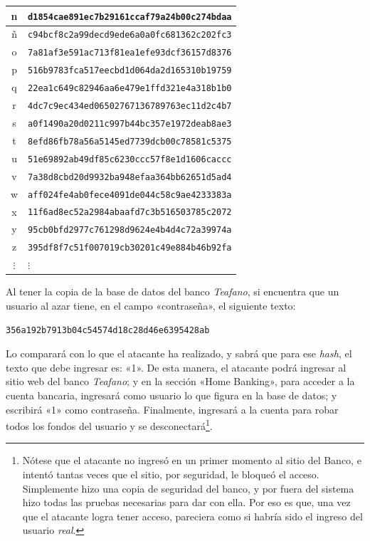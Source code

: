 \documentclass[12pt,a4paper,twoside]{book}
\begin{document}
\begin{center}
\begin{footnotesize}
\begin{longtable}{|c|l|}
n & \texttt{d1854cae891ec7b29161ccaf79a24b00c274bdaa} \\ \hline
ñ & \texttt{c94bcf8c2a99decd9ede6a0a0fc681362c202fc3} \\ \hline
o & \texttt{7a81af3e591ac713f81ea1efe93dcf36157d8376} \\ \hline
p & \texttt{516b9783fca517eecbd1d064da2d165310b19759} \\ \hline
q & \texttt{22ea1c649c82946aa6e479e1ffd321e4a318b1b0} \\ \hline
r & \texttt{4dc7c9ec434ed06502767136789763ec11d2c4b7} \\ \hline
s & \texttt{a0f1490a20d0211c997b44bc357e1972deab8ae3} \\ \hline
t & \texttt{8efd86fb78a56a5145ed7739dcb00c78581c5375} \\ \hline
u & \texttt{51e69892ab49df85c6230ccc57f8e1d1606caccc} \\ \hline
v & \texttt{7a38d8cbd20d9932ba948efaa364bb62651d5ad4} \\ \hline
w & \texttt{aff024fe4ab0fece4091de044c58c9ae4233383a} \\ \hline
x & \texttt{11f6ad8ec52a2984abaafd7c3b516503785c2072} \\ \hline
y & \texttt{95cb0bfd2977c761298d9624e4b4d4c72a39974a} \\ \hline
z & \texttt{395df8f7c51f007019cb30201c49e884b46b92fa} \\ \hline
$ \vdots $ & $ \vdots $ \\ \hline
\end{longtable}
\end{footnotesize}
\end{center}

Al tener la copia de la base de datos del banco \textit{Teafano}, si encuentra que un usuario al azar tiene, en el campo «contraseña», el siguiente texto:

\begin{center}
\texttt{356a192b7913b04c54574d18c28d46e6395428ab}
\end{center}

Lo comparará con lo que el atacante ha realizado, y sabrá que para ese \textit{hash}, el texto que debe ingresar es: «1». De esta manera, el atacante podrá ingresar al sitio web del banco \textit{Teafano}; y en la sección «Home Banking», para acceder a la cuenta bancaria, ingresará como usuario lo que figura en la base de datos; y escribirá «1» como contraseña. Finalmente, ingresará a la cuenta para robar todos los fondos del usuario y se desconectará\footnote{Nótese que el atacante no ingresó en un primer momento al sitio del Banco, e intentó tantas veces que el sitio, por seguridad, le bloqueó el acceso. Simplemente hizo una copia de seguridad del banco, y por fuera del sistema hizo todas las pruebas necesarias para dar con ella. Por eso es que, una vez que el atacante logra tener acceso, pareciera como si habría sido el ingreso del usuario \textit{real}.}.
\end{document}
